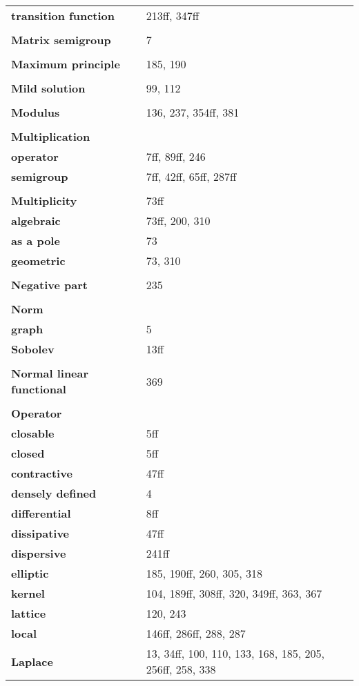 \documentclass[10pt]{scrartcl}
\begin{document}
\begin{longtable}{>{\bfseries}p{6cm}p{8cm}}
\quad transition function & 213ff, 347ff \\
\\
\textbf{Matrix semigroup} & 7 \\
\\
\textbf{Maximum principle} & 185, 190 \\
\\
\textbf{Mild solution} & 99, 112 \\
\\
\textbf{Modulus} & 136, 237, 354ff, 381 \\
\\
\textbf{Multiplication} & \\
\quad operator & 7ff, 89ff, 246 \\
\quad semigroup & 7ff, 42ff, 65ff, 287ff \\
\\
\textbf{Multiplicity} & 73ff \\
\quad algebraic & 73ff, 200, 310 \\
\quad as a pole & 73 \\
\quad geometric & 73, 310 \\
\\
\textbf{Negative part} & 235 \\
\\
\textbf{Norm} & \\
\quad graph & 5 \\
\quad Sobolev & 13ff \\
\\
\textbf{Normal linear functional} & 369 \\
\\
\textbf{Operator} & \\
\quad closable & 5ff \\
\quad closed & 5ff \\
\quad contractive & 47ff \\
\quad densely defined & 4 \\
\quad differential & 8ff \\
\quad dissipative & 47ff \\
\quad dispersive & 241ff \\
\quad elliptic & 185, 190ff, 260, 305, 318 \\
\quad kernel & 104, 189ff, 308ff, 320, 349ff, 363, 367 \\
\quad lattice & 120, 243 \\
\quad local & 146ff, 286ff, 288, 287 \\
\quad Laplace & 13, 34ff, 100, 110, 133, 168, 185, 205, 256ff, 258, 338 \\

\end{longtable}
\end{document}

